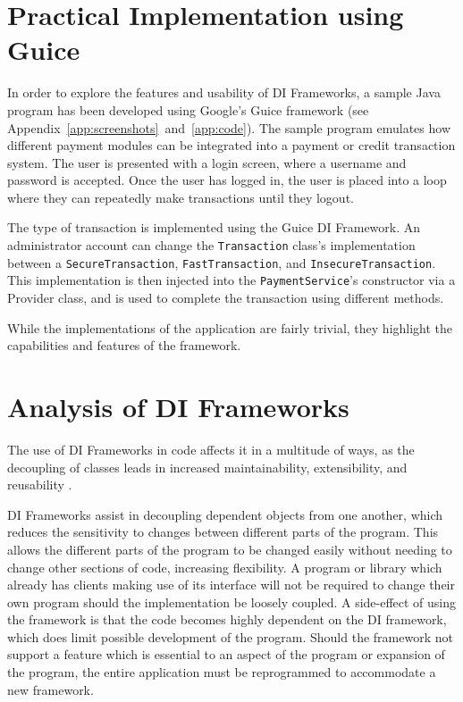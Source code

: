 \documentclass[12pt,twocolumn]{IEEEtran}
\begin{document}
\section{Practical Implementation using Guice}\label{sec:guice}

In order to explore the features and usability of DI Frameworks, a sample Java program has been developed using Google's Guice framework (see Appendix~\ref{app:screenshots}~and~\ref{app:code}). %
The sample program emulates how different payment modules can be integrated into a payment or credit transaction system. The user is presented with a login screen, where a username and password is accepted. Once the user has logged in, the user is placed into a loop where they can repeatedly make transactions until they logout. 

The type of transaction is implemented using the Guice DI Framework. An administrator account can change the \verb|Transaction| class's implementation between a \verb|SecureTransaction|, \verb|FastTransaction|, and \verb|InsecureTransaction|. This implementation is then injected into the \verb|PaymentService|'s constructor via a Provider class, and is used to complete the transaction using different methods. 


While the implementations of the application are fairly trivial, they highlight the capabilities and features of the framework.

\section{Analysis of DI Frameworks}\label{sec:analysis}

The use of DI Frameworks in code affects it in a multitude of ways, as the decoupling of classes leads in increased maintainability, extensibility, and reusability \cite{hongyulyangewantemperohaydenmelton2008,ekaterinarazinadavidjanzen2007}. 

DI Frameworks assist in decoupling dependent objects from one another, which reduces the sensitivity to changes between different parts of the program. This allows the different parts of the program to be changed easily without needing to change other sections of code, increasing flexibility. A program or library which already has clients making use of its interface will not be required to change their own program should the implementation be loosely coupled. A side-effect of using the framework is that the code becomes highly dependent on the DI framework, which does limit possible development of the program. Should the framework not support a feature which is essential to an aspect of the program or expansion of the program, the entire application must be reprogrammed to accommodate a new framework.
\end{document}
